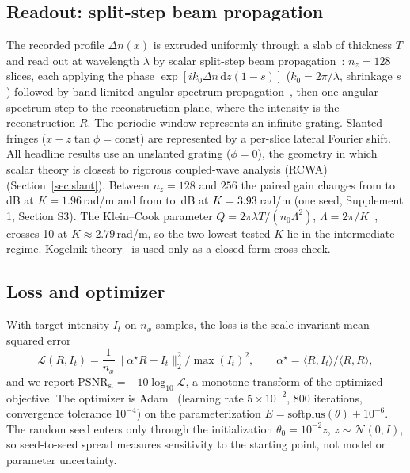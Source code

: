 \documentclass{optica-article}
\begin{document}
\subsection{Readout: split-step beam propagation}
\label{sec:model-readout}
The recorded profile $\Delta n(x)$ is extruded uniformly through a slab of
thickness $T$ and read out at wavelength $\lambda$ by scalar split-step beam
propagation~\cite{feit1978light}: $n_z=128$ slices, each applying the phase
$\exp[ik_0\Delta n\,\mathrm{d}z(1-s)]$ ($k_0=2\pi/\lambda$, shrinkage $s$)
followed by band-limited angular-spectrum propagation~\cite{goodman2005fourier},
then one angular-spectrum step to the reconstruction plane, where the
intensity is the reconstruction $R$. The periodic window represents an
infinite grating. Slanted fringes ($x-z\tan\phi=\text{const}$) are
represented by a per-slice lateral Fourier shift. All headline results use an
unslanted grating ($\phi=0$), the geometry in which scalar theory is closest
to rigorous coupled-wave analysis (RCWA)~\cite{moharam1981rigorous}
(Section~\ref{sec:slant}). Between $n_z=128$ and $256$ the paired gain changes
from \NZZeroGainKLowOneTwentyEight{} to \NZZeroGainKLowTwoFiftySix\,dB at
$K=1.96$\,rad/\textmu m and from \NZZeroGainKMidOneTwentyEight{} to
\NZZeroGainKMidTwoFiftySix\,dB at $K=3.93$\,rad/\textmu m (one seed,
Supplement 1, Section S3). The Klein--Cook parameter
$Q=2\pi\lambda T/(n_0\Lambda^2)$, $\Lambda=2\pi/K$~\cite{klein1967unified},
crosses 10 at $K\approx2.79$\,rad/\textmu m, so the two lowest tested $K$ lie
in the intermediate regime. Kogelnik theory~\cite{kogelnik1969coupled} is used
only as a closed-form cross-check.

\subsection{Loss and optimizer}
\label{sec:model-loss}
With target intensity $I_t$ on $n_x$ samples, the loss is the scale-invariant
mean-squared error
\begin{equation}
\label{eq:si-mse}
\mathcal{L}(R,I_t)=\frac{1}{n_x}\big\|\alpha^\star R-I_t\big\|_2^2\big/\max(I_t)^2,\qquad
\alpha^\star=\langle R,I_t\rangle/\langle R,R\rangle,
\end{equation}
and we report $\mathrm{PSNR}_{\text{si}}=-10\log_{10}\mathcal{L}$, a monotone
transform of the optimized objective. The optimizer is
Adam~\cite{kingma2015adam} (learning rate $5\times10^{-2}$, 800 iterations,
convergence tolerance $10^{-4}$) on the parameterization
$E=\mathrm{softplus}(\theta)+10^{-6}$. The random seed enters only through the
initialization $\theta_0=10^{-2}z$, $z\sim\mathcal{N}(0,I)$, so seed-to-seed
spread measures sensitivity to the starting point, not model or parameter
uncertainty.
\end{document}
